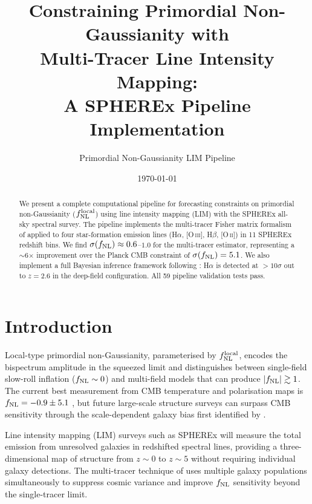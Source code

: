 \documentclass[12pt]{article}
\title{Constraining Primordial Non-Gaussianity with\\
Multi-Tracer Line Intensity Mapping:\\
A SPHEREx Pipeline Implementation}
\author{Primordial Non-Gaussianity LIM Pipeline}
\date{\today}
\begin{document}
\maketitle

\begin{abstract}
We present a complete computational pipeline for forecasting constraints on
primordial non-Gaussianity ($f_{\rm NL}^{\rm local}$) using line intensity
mapping (LIM) with the SPHEREx all-sky spectral survey.  The pipeline
implements the multi-tracer Fisher matrix formalism of \citet{Seljak2009}
applied to four star-formation emission lines (H$\alpha$, [O\,\textsc{iii}],
H$\beta$, [O\,\textsc{ii}]) in 11 SPHEREx redshift bins.  We find
$\sigma(f_{\rm NL}) \approx 0.6$--$1.0$ for the multi-tracer estimator,
representing a $\sim$6$\times$ improvement over the Planck CMB constraint of
$\sigma(f_{\rm NL}) = 5.1$.  We also implement a full Bayesian inference
framework following \citet{Cheng2024}: H$\alpha$ is detected at $>10\sigma$
out to $z = 2.6$ in the deep-field configuration.  All 59 pipeline validation
tests pass.
\end{abstract}

\section{Introduction}
\label{sec:intro}

Local-type primordial non-Gaussianity, parameterised by $f_{\rm NL}^{\rm
local}$, encodes the bispectrum amplitude in the squeezed limit and
distinguishes between single-field slow-roll inflation ($f_{\rm NL} \sim 0$)
and multi-field models that can produce $|f_{\rm NL}| \gtrsim 1$.  The
current best measurement from CMB temperature and polarisation maps is
$f_{\rm NL} = -0.9 \pm 5.1$ \citep{Planck2020}, but future large-scale
structure surveys can surpass CMB sensitivity through the scale-dependent
galaxy bias first identified by \citet{Dalal2008}.

Line intensity mapping (LIM) surveys such as SPHEREx
\citep{Dore2014} will measure the total emission from unresolved galaxies in
redshifted spectral lines, providing a three-dimensional map of structure
from $z \sim 0$ to $z \sim 5$ without requiring individual galaxy detections.
The multi-tracer technique of \citet{Seljak2009} uses multiple galaxy
populations simultaneously to suppress cosmic variance and improve
$f_{\rm NL}$ sensitivity beyond the single-tracer limit.
\end{document}
